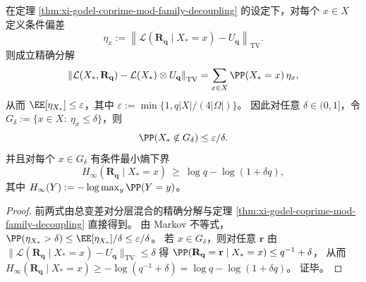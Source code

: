 \begin{corollary}[条件最小熵的几乎处处下界]\label{cor:xi-godel-conditional-minentropy-lower-bound}
在定理 \ref{thm:xi-godel-coprime-mod-family-decoupling} 的设定下，对每个 \(x\in X\) 定义条件偏差
\[
\eta_x:=\left\|\mathcal L(\mathbf R_{\mathbf q}\mid X_\ast=x)-U_{\mathbf q}\right\|_{\mathrm{TV}}.
\]
则成立精确分解
\[
\left\|\mathcal L(X_\ast,\mathbf R_{\mathbf q})-\mathcal L(X_\ast)\otimes U_{\mathbf q}\right\|_{\mathrm{TV}}
=\sum_{x\in X}\PP(X_\ast=x)\,\eta_x,
\]
从而 \(\EE[\eta_{X_\ast}]\le \varepsilon\)，其中 \(\varepsilon:=\min\{1,q|X|/(4|\Omega|)\}\)。
因此对任意 \(\delta\in(0,1]\)，令
\(
G_\delta:=\{x\in X:\ \eta_x\le \delta\}
\)，则
\[
\PP(X_\ast\notin G_\delta)\le \varepsilon/\delta.
\]
并且对每个 \(x\in G_\delta\) 有条件最小熵下界
\[
H_\infty(\mathbf R_{\mathbf q}\mid X_\ast=x)\ \ge\ \log q-\log(1+\delta q),
\]
其中 \(H_\infty(Y):=-\log\max_y\PP(Y=y)\)。
\end{corollary}
\begin{proof}
前两式由总变差对分层混合的精确分解与定理 \ref{thm:xi-godel-coprime-mod-family-decoupling} 直接得到。
由 Markov 不等式，
\(
\PP(\eta_{X_\ast}>\delta)\le \EE[\eta_{X_\ast}]/\delta\le \varepsilon/\delta
\)。
若 \(x\in G_\delta\)，则对任意 \(\mathbf r\) 由 \(\|\mathcal L(\mathbf R_{\mathbf q}\mid X_\ast=x)-U_{\mathbf q}\|_{\mathrm{TV}}\le \delta\) 得
\(
\PP(\mathbf R_{\mathbf q}=\mathbf r\mid X_\ast=x)\le q^{-1}+\delta
\)，
从而
\(
H_\infty(\mathbf R_{\mathbf q}\mid X_\ast=x)\ge -\log(q^{-1}+\delta)=\log q-\log(1+\delta q)
\)。
证毕。
\end{proof}

